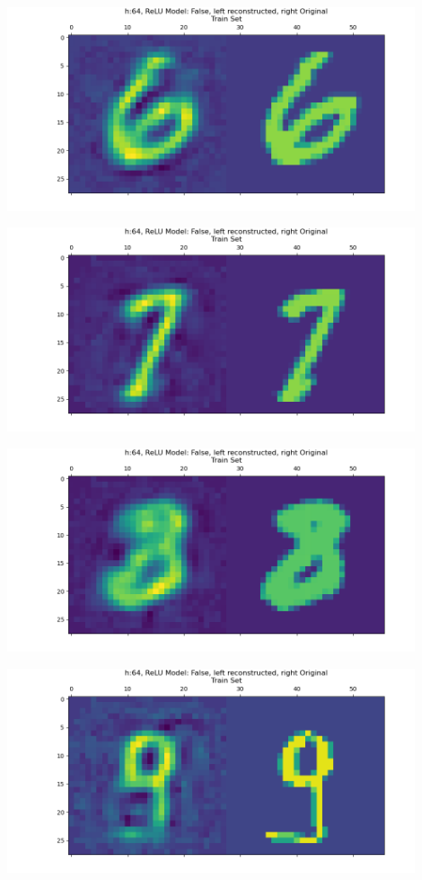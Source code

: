 \documentclass[]{article}
\begin{document}
        \begin{center}
            \includegraphics*[width=12cm]{A4plots/06-43-19-h-64-lin-digit-6.png}
        \end{center}
        \begin{center}
            \includegraphics*[width=12cm]{A4plots/06-43-19-h-64-lin-digit-7.png}
        \end{center}
        \begin{center}
            \includegraphics*[width=12cm]{A4plots/06-43-19-h-64-lin-digit-8.png}
        \end{center}
        \begin{center}
            \includegraphics*[width=12cm]{A4plots/06-43-19-h-64-lin-digit-9.png}
        \end{center}
\end{document}
